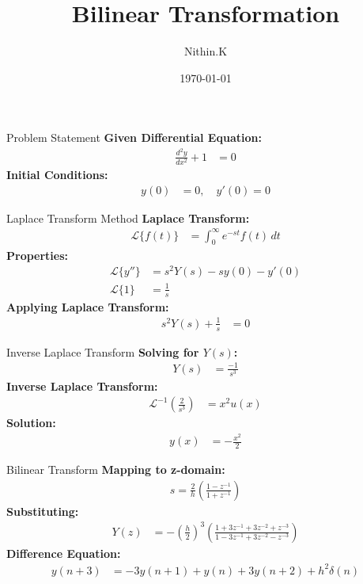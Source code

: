 \documentclass{beamer}
\title{Bilinear Transformation}
\author{Nithin.K}
\date{\today}
\begin{document}
\begin{frame}
	\titlepage
\end{frame}

\begin{frame}{Problem Statement}
	\textbf{Given Differential Equation:}
	\begin{align}
		\frac{d^2y}{dx^2} + 1 &= 0
	\end{align}
	\textbf{Initial Conditions:}
	\begin{align}
		y(0) &= 0, \quad y'(0) = 0
	\end{align}
\end{frame}

\begin{frame}{Laplace Transform Method}
	\textbf{Laplace Transform:}
	\begin{align}
		\mathcal{L}\{f(t)\} &= \int_{0}^{\infty} e^{-st} f(t) \, dt
	\end{align}
	\textbf{Properties:}
	\begin{align}
		\mathcal{L}\{y''\} &= s^2 Y(s) - s y(0) - y'(0) \\
		\mathcal{L}\{1\} &= \frac{1}{s}
	\end{align}
	\textbf{Applying Laplace Transform:}
	\begin{align}
		s^2 Y(s) + \frac{1}{s} &= 0
	\end{align}
\end{frame}

\begin{frame}{Inverse Laplace Transform}
	\textbf{Solving for $Y(s)$:}
	\begin{align}
		Y(s) &= \frac{-1}{s^3}
	\end{align}
	\textbf{Inverse Laplace Transform:}
	\begin{align}
		\mathcal{L}^{-1}\left(\frac{2}{s^3}\right) &= x^2 u(x)
	\end{align}
	\textbf{Solution:}
	\begin{align}
		y(x) &= -\frac{x^2}{2}
	\end{align}
\end{frame}

\begin{frame}{Bilinear Transform}
	\textbf{Mapping to z-domain:}
	\begin{align}
		s = \frac{2}{h} \left(\frac{1 - z^{-1}}{1 + z^{-1}} \right)
	\end{align}
	\textbf{Substituting:}
	\begin{align}
		Y(z) &= -\left(\frac{h}{2}\right)^3 \left(\frac{1 + 3z^{-1} + 3z^{-2} + z^{-3}}{1 - 3z^{-1} + 3z^{-2} - z^{-3}} \right)
	\end{align}
	\textbf{Difference Equation:}
	\begin{align}
		y(n+3) &= -3y(n+1) + y(n) + 3y(n+2) + h^2\delta(n)
	\end{align}
\end{frame}
\end{document}
